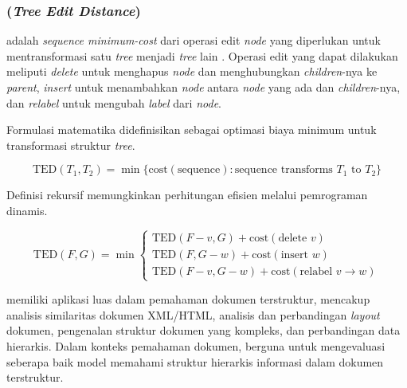 \subsubsection{\ted (\emph{Tree Edit Distance})}

\ted adalah \emph{sequence minimum-cost} dari operasi edit \emph{node} yang diperlukan untuk mentransformasi satu \emph{tree} menjadi \emph{tree} lain \parencite{zhang1989tree}. Operasi edit yang dapat dilakukan meliputi \emph{delete} untuk menghapus \emph{node} dan menghubungkan \emph{children}-nya ke \emph{parent}, \emph{insert} untuk menambahkan \emph{node} antara \emph{node} yang ada dan \emph{children}-nya, dan \emph{relabel} untuk mengubah \emph{label} dari \emph{node}.

Formulasi matematika \ted didefinisikan sebagai optimasi biaya minimum untuk transformasi struktur \emph{tree}.

\begin{equation}
\text{TED}(T_1, T_2) = \min\{\text{cost}(\text{sequence}) : \text{sequence transforms } T_1 \text{ to } T_2\}
\end{equation}

Definisi rekursif \ted memungkinkan perhitungan efisien melalui pemrograman dinamis.

\begin{equation}
\text{TED}(F, G) = \min \begin{cases}
\text{TED}(F-v, G) + \text{cost}(\text{delete } v) \\
\text{TED}(F, G-w) + \text{cost}(\text{insert } w) \\
\text{TED}(F-v, G-w) + \text{cost}(\text{relabel } v \rightarrow w)
\end{cases}
\end{equation}

\ted memiliki aplikasi luas dalam pemahaman dokumen terstruktur, mencakup analisis similaritas dokumen XML/HTML, analisis dan perbandingan \emph{layout} dokumen, pengenalan struktur dokumen yang kompleks, dan perbandingan data hierarkis. Dalam konteks pemahaman dokumen, \ted berguna untuk mengevaluasi seberapa baik model memahami struktur hierarkis informasi dalam dokumen terstruktur.
